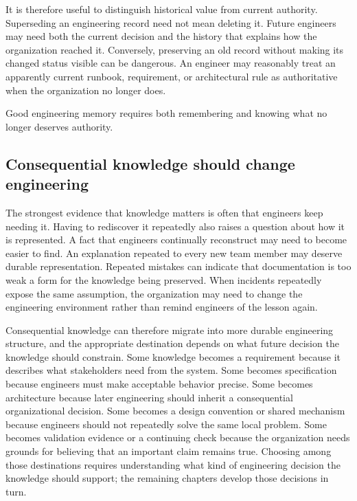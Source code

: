 It is therefore useful to distinguish historical value from current authority. Superseding an
engineering record need not mean deleting it. Future engineers may need both the current decision
and the history that explains how the organization reached it. Conversely, preserving an old record
without making its changed status visible can be dangerous. An engineer may reasonably treat an
apparently current runbook, requirement, or architectural rule as authoritative when the
organization no longer does.

Good engineering memory requires both remembering and knowing what no longer deserves authority.

\subsection{Consequential knowledge should change engineering}\label{sec-knowledge-changes-engineering}

The strongest evidence that knowledge matters is often that engineers keep needing it. Having to
rediscover it repeatedly also raises a question about how it is represented. A fact that
engineers continually reconstruct may need to become easier to find. An explanation repeated to
every new team member may deserve durable representation. Repeated mistakes can indicate that
documentation is too weak a form for the knowledge being preserved. When incidents repeatedly
expose the same assumption, the organization may need to change the engineering environment rather
than remind engineers of the lesson again.

Consequential knowledge can therefore migrate into more durable engineering structure, and the
appropriate destination depends on what future decision the knowledge should constrain. Some
knowledge becomes a requirement because it describes what stakeholders need from the system. Some
becomes specification because engineers must make acceptable behavior precise. Some becomes
architecture because later engineering should inherit a consequential organizational decision. Some
becomes a design convention or shared mechanism because engineers should not repeatedly solve the
same local problem. Some becomes validation evidence or a continuing check because the organization
needs grounds for believing that an important claim remains true. Choosing among those destinations
requires understanding what kind of engineering decision the knowledge should support; the remaining
chapters develop those decisions in turn.


